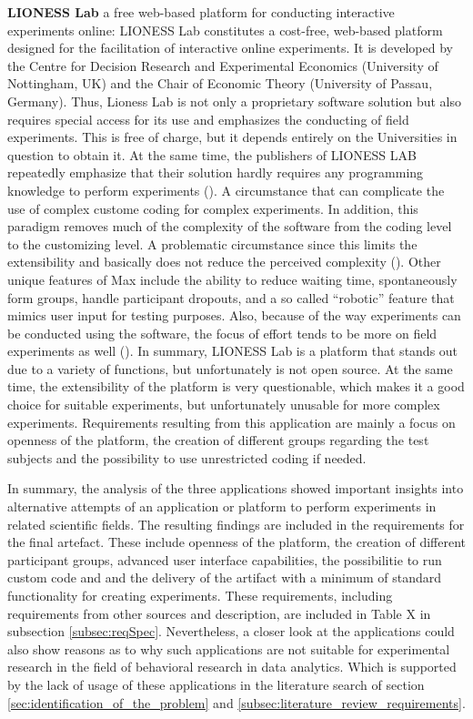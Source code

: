 \textbf{LIONESS Lab} a free web-based platform for conducting interactive experiments online:
LIONESS Lab constitutes a cost-free, web-based platform designed for the facilitation of interactive online experiments. It is developed by the Centre for Decision Research and Experimental Economics (University of Nottingham, UK) and the Chair of Economic Theory (University of Passau, Germany). Thus, Lioness Lab is not only a proprietary software solution but also requires special access for its use and emphasizes the conducting of field experiments. This is free of charge, but it depends entirely on the Universities in question to obtain it. At the same time, the publishers of LIONESS LAB repeatedly emphasize that their solution hardly requires any programming knowledge to perform experiments (\cite{Giamattei.2020}). A circumstance that can complicate the use of complex custome coding for complex experiments. In addition, this paradigm removes much of the complexity of the software from the coding level to the customizing level. A problematic circumstance since this limits the extensibility and basically does not reduce the perceived complexity (\cite{Chou.2008}). Other unique features of Max include the ability to reduce waiting time, spontaneously form groups, handle participant dropouts, and a so called \enquote{robotic} feature that mimics user input for testing purposes. Also, because of the way experiments can be conducted using the software, the focus of effort tends to be more on field experiments as well (\cite{Giamattei.2020}). In summary, LIONESS Lab is a platform that stands out due to a variety of functions, but unfortunately is not open source. At the same time, the extensibility of the platform is very questionable, which makes it a good choice for suitable experiments, but unfortunately unusable for more complex experiments. Requirements resulting from this application are mainly a focus on openness of the platform, the creation of different groups regarding the test subjects and the possibility to use unrestricted coding if needed.

In summary, the analysis of the three applications showed important insights into alternative attempts of an application or platform to perform experiments in related scientific fields. The resulting findings are included in the requirements for the final artefact. These include openness of the platform, the creation of different participant groups, advanced user interface capabilities, the possibilitie to run custom code and and the delivery of the artifact with a minimum of standard functionality for creating experiments. These requirements, including requirements from other sources and description, are included in Table X in subsection \ref{subsec:reqSpec}. Nevertheless, a closer look at the applications could also show reasons as to why such applications are not suitable for experimental research in the field of behavioral research in data analytics. Which is supported by the lack of usage of these applications in the literature search of section \ref{sec:identification_of_the_problem} and \ref{subsec:literature_review_requirements}.

